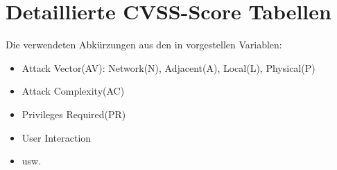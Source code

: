 \section{Detaillierte CVSS-Score Tabellen}
    Die verwendeten Abkürzungen aus den in  vorgestellen Variablen:
    \begin{itemize}[noitemsep]
        \item Attack Vector(AV): Network(N), Adjacent(A), Local(L), Physical(P)
        \item Attack Complexity(AC)
        \item Privileges Required(PR)
        \item User Interaction
        \item usw. 
    \end{itemize}

